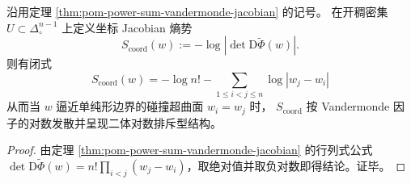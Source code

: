 
\begin{corollary}\label{cor:pom-power-sum-jacobian-entropy}
沿用定理 \ref{thm:pom-power-sum-vandermonde-jacobian} 的记号。
在开稠密集 \(U\subset\Delta_{\circ}^{n-1}\) 上定义坐标 Jacobian 熵势
\[
S_{\mathrm{coord}}(w):=-\log\left|\det \mathrm{D}\widetilde\Phi(w)\right|.
\]
则有闭式
\[
\boxed{\;
S_{\mathrm{coord}}(w)
=-\log n!
-\sum_{1\le i<j\le n}\log|w_j-w_i|\;}
\]
从而当 \(w\) 逼近单纯形边界的碰撞超曲面 \(w_i=w_j\) 时，
\(S_{\mathrm{coord}}\) 按 Vandermonde 因子的对数发散并呈现二体对数排斥型结构。
\end{corollary}
\begin{proof}
由定理 \ref{thm:pom-power-sum-vandermonde-jacobian} 的行列式公式
\(
\det \mathrm{D}\widetilde\Phi(w)=n!\prod_{i<j}(w_j-w_i)
\)，取绝对值并取负对数即得结论。证毕。
\end{proof}

